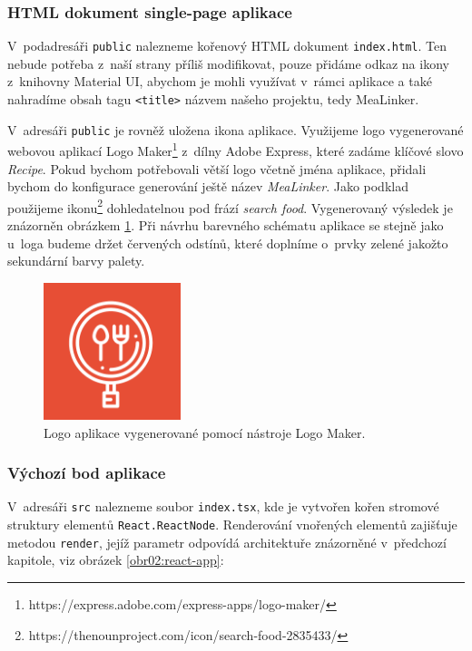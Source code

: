 \subsubsection{HTML dokument single-page aplikace}

V~podadresáři \texttt{public} nalezneme kořenový HTML dokument \texttt{index.html}. Ten nebude potřeba z~naší strany příliš modifikovat, pouze přidáme odkaz na ikony z~knihovny Material UI, abychom je mohli využívat v~rámci aplikace a také nahradíme obsah tagu \texttt{<title>} názvem našeho projektu, tedy MeaLinker.

V~adresáři \texttt{public} je rovněž uložena ikona aplikace. Využijeme logo vygenerované webovou aplikací Logo Maker\footnote{https://express.adobe.com/express-apps/logo-maker/} z~dílny Adobe Express, které zadáme klíčové slovo \emph{Recipe}. Pokud bychom potřebovali větší logo včetně jména aplikace, přidali bychom do konfigurace generování ještě název \emph{MeaLinker}. Jako podklad použijeme ikonu\footnote{https://thenounproject.com/icon/search-food-2835433/} dohledatelnou pod frází \emph{search food}. Vygenerovaný výsledek je znázorněn obrázkem \ref{obr03:mealinker-logo}. Při návrhu barevného schématu aplikace se stejně jako u~loga budeme držet červených odstínů, které doplníme o~prvky zelené jakožto sekundární barvy palety.

\begin{figure}[h!]\centering
\includegraphics[width=40mm]{../img/mealinker-logo}
\caption{Logo aplikace vygenerované pomocí nástroje Logo Maker.}
\label{obr03:mealinker-logo}
\end{figure}

\subsubsection{Výchozí bod aplikace}

V~adresáři \texttt{src} nalezneme soubor \texttt{index.tsx}, kde je vytvořen kořen stromové struktury elementů \texttt{React.ReactNode}. Renderování vnořených elementů zajišťuje metodou \texttt{render}, jejíž parametr odpovídá architektuře znázorněné v~předchozí kapitole, viz obrázek \ref{obr02:react-app}:

